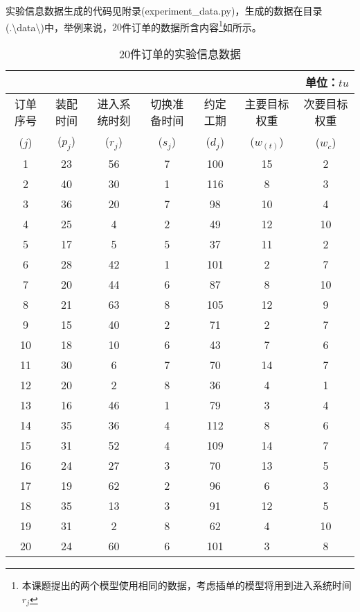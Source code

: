 实验信息数据生成的代码见附录(experiment\_data.py)，生成的数据在目录(.\textbackslash data\textbackslash)中，举例来说，$20$件订单的数据所含内容\footnote{本课题提出的两个模型使用相同的数据，考虑插单的模型将用到进入系统时间$r_j$}如所示。
\begin{table}[h]
  \centering
  \caption{$20$件订单的实验信息数据}
    \begin{tabular}{ccccccc}
     	&	&	&	&	&	&\multicolumn{1}{r}{单位：$tu$}\\
    \toprule
    订单序号 & 装配时间 & 进入系统时刻 & 切换准备时间& 约定工期 & 主要目标权重 & 次要目标权重 \\
    ($j$) & ($p_j$) & ($r_j$) &($s_j$) &($d_j$) &($w_{(t)}$) & ($w_c$) \\
    \midrule
    1     & 23    & 56    & 7     & 100   & 15    & 2 \\
    2     & 40    & 30    & 1     & 116   & 8     & 3 \\
    3     & 36    & 20    & 7     & 98    & 10    & 4 \\
    4     & 25    & 4     & 2     & 49    & 12    & 10 \\
    5     & 17    & 5     & 5     & 37    & 11    & 2 \\
    6     & 28    & 42    & 1     & 101   & 2     & 7 \\
    7     & 20    & 44    & 6     & 87    & 8     & 10 \\
    8     & 21    & 63    & 8     & 105   & 12    & 9 \\
    9     & 15    & 40    & 2     & 71    & 2     & 7 \\
    10    & 18    & 10    & 6     & 43    & 7     & 6 \\
    11    & 30    & 6     & 7     & 70    & 14    & 7 \\
    12    & 20    & 2     & 8     & 36    & 4     & 1 \\
    13    & 16    & 46    & 1     & 79    & 3     & 4 \\
    14    & 35    & 36    & 4     & 112   & 8     & 6 \\
    15    & 31    & 52    & 4     & 109   & 14    & 7 \\
    16    & 24    & 27    & 3     & 70    & 13    & 5 \\
    17    & 19    & 62    & 2     & 96    & 6     & 3 \\
    18    & 35    & 13    & 3     & 91    & 12    & 5 \\
    19    & 31    & 2     & 8     & 62    & 4     & 10 \\
    20    & 24    & 60    & 6     & 101   & 3     & 8 \\
    \bottomrule
    \end{tabular}
  \label{tab:20itemsdata}
\end{table}

